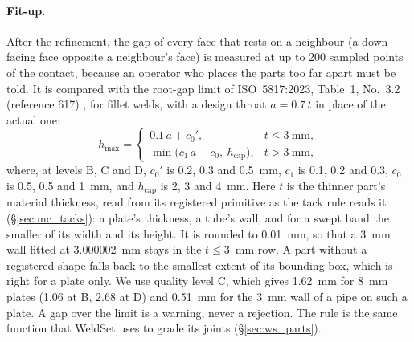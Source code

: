 \paragraph{Fit-up.} After the refinement, the gap of every face that rests on a neighbour (a
down-facing face opposite a neighbour's face) is measured at up to 200 sampled points of the
contact, because an operator who places the parts too far apart must be told. It is compared with
the root-gap limit of ISO~5817:2023, Table~1, No.~3.2 (reference 617) \cite{iso5817}, for fillet
welds, with a design throat $a=0.7\,t$ in place of the actual one:
\begin{equation}
h_{\max}=
\begin{cases}
0.1\,a+c_0', & t\le3~\mathrm{mm},\\
\min\big(c_1\,a+c_0,\ h_{\mathrm{cap}}\big), & t>3~\mathrm{mm},
\end{cases}
\label{eq:iso_gap}
\end{equation}
where, at levels B, C and D, $c_0'$ is 0.2, 0.3 and 0.5~mm, $c_1$ is 0.1, 0.2 and 0.3, $c_0$ is
0.5, 0.5 and 1~mm, and $h_{\mathrm{cap}}$ is 2, 3 and 4~mm.
Here $t$ is the thinner part's material thickness, read from its registered primitive as the tack
rule reads it (\S\ref{sec:mc_tacks}): a plate's thickness, a tube's wall, and for a swept band the
smaller of its width and its height. It is rounded to 0.01~mm, so that a 3~mm wall fitted at
3.000002~mm stays in the $t\le3$~mm row. A part without a registered shape falls back to the
smallest extent of its bounding box, which is right for a plate only. We use quality level C, which
gives 1.62~mm for 8~mm plates (1.06 at B, 2.68 at D) and 0.51~mm for the 3~mm wall of a pipe on such a
plate. A gap over the limit is a warning, never a rejection. The rule is the same function that
WeldSet uses to grade its joints (\S\ref{sec:ws_parts}).

